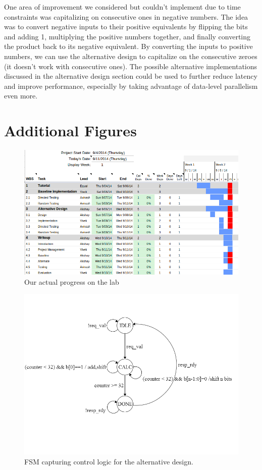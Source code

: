 \documentclass[10pt]{article}
\begin{document}
One area of improvement we considered but couldn't implement due to time constraints was capitalizing on consecutive ones in negative numbers. The idea was to convert negative inputs to their positive equivalents by flipping the bits and adding 1, multiplying the positive numbers together, and finally converting the product back to its negative equivalent. By converting the inputs to positive numbers, we can use the alternative design to capitalize on the consecutive zeroes (it doesn't work with consecutive ones). 
The possible alternative implementations discussed in the alternative design section could be used to further reduce latency and improve performance, especially by taking advantage of data-level parallelism even more. 

\section{Additional Figures}

\begin{figure}[h]
\centering
\includegraphics[scale=0.45]{gantt_actual}
\caption{Our actual progress on the lab}
\label{fig:gantt_actual}
\end{figure}



\begin{figure}[b]
\centering
\includegraphics[scale=0.6]{AltFSM}
\caption{FSM capturing control logic for the alternative design.}
\label{fig:AltFSM}
\end{figure}
\end{document}

